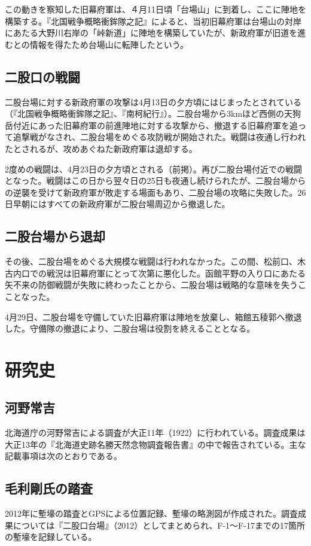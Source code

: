 \documentclass[14Q]{jsarticle}
\begin{document}
この動きを察知した旧幕府軍は、４月11日頃「台場山」に到着し、ここに陣地を構築する。『北国戦争概略衝鉾隊之記』によると、当初旧幕府軍は台場山の対岸にあたる大野川右岸の「峠新道」に陣地を構築していたが、新政府軍が旧道を進むとの情報を得たため台場山に転陣したという。

\subsection{二股口の戦闘}
二股台場に対する新政府軍の攻撃は4月13日の夕方頃にはじまったとされている（『北国戦争概略衝鉾隊之記』、『南柯紀行』）。二股台場から3kmほど西側の天狗岳付近にあった旧幕府軍の前進陣地に対する攻撃から、撤退する旧幕府軍を追って追撃戦がなされ、二股台場をめぐる攻防戦が開始された。戦闘は夜通し行われたとされるが、攻めあぐねた新政府軍は退却する。

2度めの戦闘は、4月23日の夕方頃とされる（前掲）。再び二股台場付近での戦闘となった。戦闘はこの日から翌々日の25日も夜通し続けられたが、二股台場からの逆襲を受けて新政府軍が敗走する場面もあり、二股台場の攻略に失敗した。26日早朝にはすべての新政府軍が二股台場周辺から撤退した。

\subsection{二股台場から退却}
その後、二股台場をめぐる大規模な戦闘は行われなかった。この間、松前口、木古内口での戦況は旧幕府軍にとって次第に悪化した。函館平野の入り口にあたる矢不来の防御戦闘が失敗に終わったことから、二股台場は戦略的な意味を失うこことなった。

4月29日、二股台場を守備していた旧幕府軍は陣地を放棄し、箱館五稜郭へ撤退した。守備隊の撤退により、二股台場は役割を終えることとなる。

\section{研究史}
\subsection{河野常吉}
北海道庁の河野常吉による調査が大正11年（1922）に行われている。調査成果は大正13年の『北海道史跡名勝天然念物調査報告書』の中で報告されている。主な記載事項は次のとおりである。

\subsection{毛利剛氏の踏査}
2012年に塹壕の踏査とGPSによる位置記録、塹壕の略測図が作成された。調査成果については『二股口台場』（2012）としてまとめられ、F-1〜F-17までの17箇所の塹壕を記録している。
\end{document}

